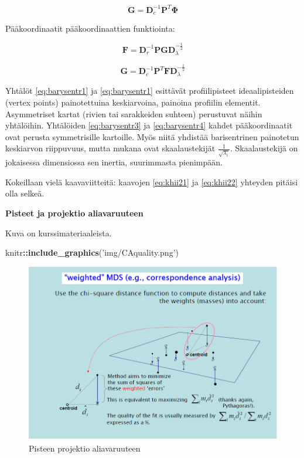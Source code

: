 \documentclass[
  finnish,
]{book}
\newenvironment{Shaded}{\begin{snugshade}}{\end{snugshade}}
\newcommand{\KeywordTok}[1]{\textcolor[rgb]{0.13,0.29,0.53}{\textbf{#1}}}
\newcommand{\NormalTok}[1]{#1}
\newcommand{\OperatorTok}[1]{\textcolor[rgb]{0.81,0.36,0.00}{\textbf{#1}}}
\newcommand{\StringTok}[1]{\textcolor[rgb]{0.31,0.60,0.02}{#1}}
\begin{document}
\begin{equation}
\boldsymbol{G} = \boldsymbol{D}_{c}^{-1} \boldsymbol{P}^{T}\boldsymbol{\Phi}
\label{eq:barysentr2}
\end{equation}

Pääkoordinaatit pääkoordinaattien funktiointa:

\begin{equation}
\boldsymbol{F} = \boldsymbol{D}_{r}^{-1} \boldsymbol{P}\boldsymbol{G}\boldsymbol{D}_{\lambda}^{-\frac{1}{2}}
\label{eq:barysentr3}
\end{equation}

\begin{equation}
\boldsymbol{G} = \boldsymbol{D}_{c}^{-1} \boldsymbol{P}^{T}\boldsymbol{F}\boldsymbol{D}_{\lambda}^{-\frac{1}{2}}
\label{eq:barysentr4}
\end{equation}

Yhtälöt \eqref{eq:barysentr1} ja \eqref{eq:barysentr1} esittävät profiilipisteet ideaalipisteiden (vertex points)
painotettuina keskiarvoina, painoina profiilin elementit. Asymmetriset kartat
(rivien tai sarakkeiden suhteen) perustuvat näihin yhtälöihin. Yhtälöiden \eqref{eq:barysentr3}
ja \eqref{eq:barysentr4} kahdet pääkoordinaatit ovat perusta symmetrisille kartoille. Myös niitä
yhdistää barisentrinen painotetun keskiarvon riippuvuus, mutta mukana ovat skaalaustekijät
\(\frac{1}{\sqrt{\lambda_{i}}}\). Skaalaustekijä on jokaisessa dimensiossa sen inertia, suurimmasta pienimpään.

Kokeillaan vielä kaavaviitteitä: kaavojen \eqref{eq:khii21} ja \eqref{eq:khii22}
yhteyden pitäisi olla selkeä.

\textbf{Pisteet ja projektio aliavaruuteen}

Kuva on kurssimateriaaleista\citep{RefWorks:doc:5b6ef091e4b0984fd9b8c0ca}.

\begin{Shaded}
\begin{Highlighting}[]
\NormalTok{knitr}\OperatorTok{::}\KeywordTok{include_graphics}\NormalTok{(}\StringTok{'img/CAquality.png'}\NormalTok{)}
\end{Highlighting}
\end{Shaded}

\begin{figure}

{\centering \includegraphics[width=0.7\linewidth]{img/CAquality} 

}

\caption{Pisteen projektio aliavaruuteen}\label{fig:projectionimg1}
\end{figure}
\end{document}
